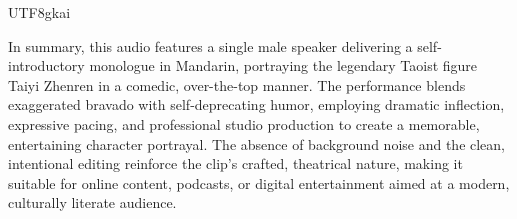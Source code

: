 \begin{CJK*}{UTF8}{gkai}
\begin{tcolorbox}
In summary, this audio features a single male speaker delivering a self-introductory monologue in Mandarin, portraying the legendary Taoist figure Taiyi Zhenren in a comedic, over-the-top manner. The performance blends exaggerated bravado with self-deprecating humor, employing dramatic inflection, expressive pacing, and professional studio production to create a memorable, entertaining character portrayal. The absence of background noise and the clean, intentional editing reinforce the clip’s crafted, theatrical nature, making it suitable for online content, podcasts, or digital entertainment aimed at a modern, culturally literate audience.


\end{tcolorbox}
\end{CJK*}





